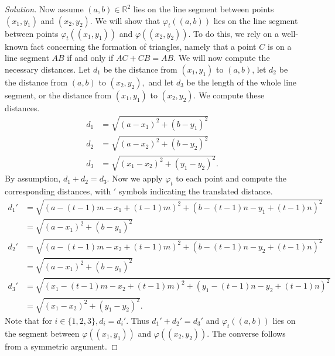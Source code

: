\documentclass[12pt]{article}
\newcommand{\R}{\mathbb{R}}
\newenvironment{exercise}[2][Exercise]{\begin{trivlist}
        \item[\hskip \labelsep {\bfseries #1}\hskip \labelsep {\bfseries #2.}]}{\end{trivlist}}
\newenvironment{solution}
        {\begin{proof}[Solution]}
                    {\end{proof}}
\begin{document}
\begin{exercise}{26}
\begin{solution}
        Now assume \( ( a,b ) \in \R^{2} \) lies on the line segment between points \((x_{1} , y_{1}) \) and \( ( x_{2} , y_{2} ) . \) We will show that \( \varphi_{t}(( a,b )) \) lies on the line segment between points \( \varphi_{t}(( x_{1} , y_{1} )) \) and \( \varphi(( x_{2} , y_{2} )) \). To do this, we rely on a well-known fact concerning the formation of triangles, namely that a point \( C \) is on a line segment \( AB \) if and only if \( AC + CB = AB. \) We will now compute the necessary distances. Let \( d_{1} \) be the distance from \( ( x_{1} , y_{1} ) \) to \( ( a,b ) \), let \( d_{2}  \) be the distance from \( ( a,b ) \) to \( ( x_{2} , y_{2} ) , \) and let \( d_{3} \) be the length of the whole line segment, or the distance from \( ( x_{1} , y_{1} ) \) to \( ( x_{2}, y_{2} ) . \) We compute these distances.
        \begin{align*}
            d_{1} &= \sqrt{( a-x_{1} )^{2} + ( b-y_{1} )^{2}} \\
            d_{2} &= \sqrt{( a-x_{2} )^{2} + ( b-y_{2} )^{2}} \\
            d_{3} &= \sqrt{( x_{1} - x_{2} )^{2} + ( y_{1} - y_{2} )^{2} } .
        \end{align*}
        By assumption, \( d_{1} + d_{2} = d_{3} . \) Now we apply \( \varphi_{t} \) to each point and compute the corresponding distances, with \( ' \) symbols indicating the translated distance.
        \begin{align*}
            d_{1}' &= \sqrt{ (a - (t-1)m - x_{1} + ( t-1 ) m)^{2} + ( b - ( t-1 ) n - y_{1} + ( t-1 ) n )^{2} }\\
             &= \sqrt{( a-x_{1} )^{2} + ( b-y_{1} )^{2}} \\
            d_{2}' &= \sqrt{ (a - (t-1)m - x_{2} + ( t-1 ) m)^{2} + ( b - ( t-1 ) n - y_{2} + ( t-1 ) n )^{2} }\\
             &= \sqrt{( a-x_{1} )^{2} + ( b-y_{1} )^{2}} \\
            d_{3}' &= \sqrt{ (x_{1} - (t-1)m - x_{2} + ( t-1 ) m)^{2} + ( y_{1}  - ( t-1 ) n - y_{2} + ( t-1 ) n )^{2} }\\
            &= \sqrt{( x_{1} - x_{2} )^{2} + ( y_{1} - y_{2} )^{2} } .
        \end{align*}
        Note that for \( i \in \{ 1,2,3 \} , d_{i} = d_{i} '.\) Thus \( d_{1} ' + d_{2} ' = d_{3}'  \) and \( \varphi_{t}(( a,b )) \) lies on the segment between \( \varphi(( x_{1} ,y_{1} ))\) and \( \varphi(( x_{2} , y_{2} )) \). The converse follows from a symmetric argument.


\end{solution}
\end{exercise}
\end{document}
